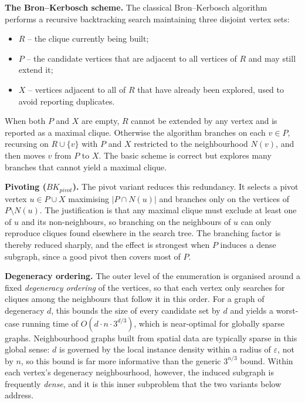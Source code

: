 \documentclass[12pt, letterpaper]{template}
\theoremstyle{definition}
\begin{document}
\noindent\textbf{The Bron--Kerbosch scheme.}
The classical Bron--Kerbosch algorithm~\cite{bron1973algorithm} performs a recursive
backtracking search maintaining three disjoint vertex sets:
\begin{itemize}
    \item $R$ -- the clique currently being built;
    \item $P$ -- the candidate vertices that are adjacent to all vertices of $R$ and may still extend it;
    \item $X$ -- vertices adjacent to all of $R$ that have already been explored, used to avoid reporting duplicates.
\end{itemize}
When both $P$ and $X$ are empty, $R$ cannot be extended by any vertex and is reported as a
maximal clique. Otherwise the algorithm branches on each $v \in P$, recursing on
$R \cup \{v\}$ with $P$ and $X$ restricted to the neighbourhood $N(v)$, and then moves $v$
from $P$ to $X$. The basic scheme is correct but explores many branches that cannot yield a
maximal clique.

\noindent\textbf{Pivoting ($BK_{pivot}$).}
The pivot variant reduces this redundancy. It selects a pivot vertex
$u \in P \cup X$ maximising $|P \cap N(u)|$ and branches only on the vertices of
$P \setminus N(u)$. The justification is that any maximal clique must exclude at least one
of $u$ and its non-neighbours, so branching on the neighbours of $u$ can only reproduce
cliques found elsewhere in the search tree. The branching factor is thereby reduced sharply,
and the effect is strongest when $P$ induces a dense subgraph, since a good pivot then covers
most of $P$.

\noindent\textbf{Degeneracy ordering.}
The outer level of the enumeration is organised around a fixed
\emph{degeneracy ordering} of the vertices, so that each vertex only
searches for cliques among the neighbours that follow it in this order.
For a graph of degeneracy $d$, this bounds the size of every candidate set
by $d$ and yields a worst-case running time of $O(d \cdot n \cdot 3^{d/3})$,
which is near-optimal for globally sparse graphs. Neighbourhood graphs
built from spatial data are typically sparse in this global sense: $d$ is
governed by the local instance density within a radius of $\varepsilon$,
not by $n$, so this bound is far more informative than the generic
$3^{n/3}$ bound. Within each vertex's degeneracy neighbourhood, however,
the induced subgraph is frequently \emph{dense}, and it is this inner
subproblem that the two variants below address.
\end{document}
